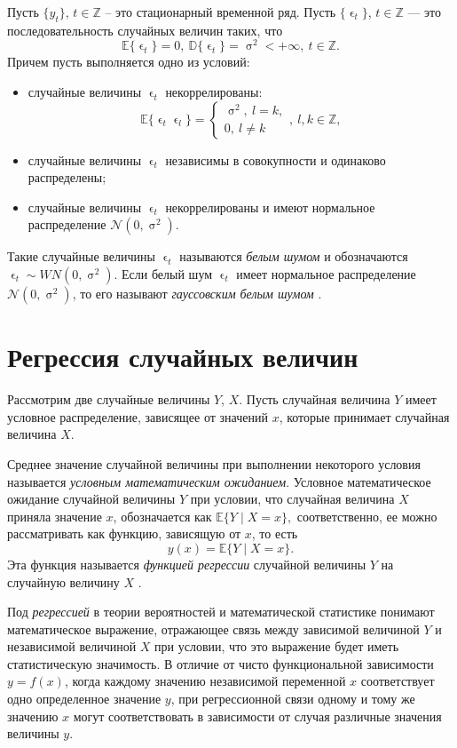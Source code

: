\documentclass[a4paper, 14pt]{extreport}
\numberwithin{equation}{section}
\newcommand{\Z}{\mathbb{Z}}
\renewcommand{\epsilon}{\upvarepsilon}
\renewcommand{\sigma}{\upsigma}
\newcommand{\E}{\mathbb E}
\numberwithin{equation}{section}
\begin{document}
	Пусть $\{y_t\}$, $t \in\mathbb Z$ -- это стационарный временной ряд.
	Пусть $\{\epsilon_t\}$, $t \in\mathbb Z$ --- это последовательность случайных величин таких, что $$\mathbb{E}\{\epsilon_t\} = 0,\ \mathbb{D}\{\epsilon_t\} = \sigma^2 < +\infty,\ t\in \Z.$$ Причем пусть выполняется одно из условий:
	\begin{itemize}
		\item случайные величины $\epsilon_t$ некоррелированы: $$\mathbb E \{ \epsilon _t \epsilon_l\} = \begin{cases}\sigma^2,\ l = k,\\ 0,\ l \ne k\end{cases},\ l,k \in \mathbb Z,$$
		\item случайные величины $\epsilon_t$ независимы в совокупности и одинаково распределены;
		\item случайные величины $\epsilon_t$ некоррелированы и имеют нормальное распределение $\mathcal{N}(0,\sigma^2)$.
	\end{itemize}
	Такие случайные величины $\epsilon_t$ называются \textit{белым шумом} и обозначаются $\epsilon_t\sim WN(0,\sigma^2)$. Если белый шум $\epsilon_t$ имеет нормальное распределение $\mathcal N(0,\sigma^2)$, то его называют \textit{гауссовским белым шумом} \cite{1}.
	
	\section{Регрессия случайных величин}
	Рассмотрим две случайные величины $Y$, $X$. Пусть случайная величина $Y$ имеет условное распределение, зависящее от значений $x$, которые принимает случайная величина $X$.
	
	Среднее значение случайной величины при выполнении некоторого условия называется \textit{условным математическим ожиданием}.
	Условное математическое ожидание случайной величины 
	$Y$ при условии, что случайная величина $X$ приняла значение 
	$x$, обозначается как $\E \{Y\mid X = x\},$ соответственно, ее можно рассматривать как функцию, зависящую от $x$, то есть
	\begin{equation}
		y(x) =\E \{Y\mid X = x\}.
	\end{equation} 
	Эта функция называется \textit{функцией регрессии} случайной величины 
	$Y$ на случайную величину $X$ \cite{2}.
	
	Под \textit{регрессией} в теории вероятностей и математической статистике понимают математическое выражение, отражающее связь между зависимой величиной $Y$ и независимой величиной $X$ при условии, что это выражение будет иметь статистическую значимость. В отличие от чисто функциональной зависимости $y=f(x)$, когда каждому значению независимой переменной $x$ соответствует одно определенное значение $y$, при регрессионной связи одному и тому же значению $x$ могут соответствовать в зависимости от случая различные значения величины $y$.
	
\end{document}
